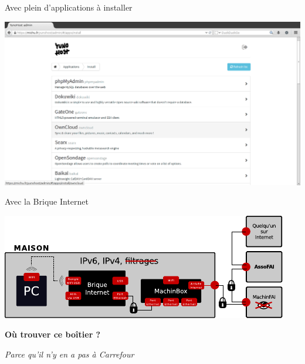 \documentclass[notes=hide]{beamer}
\begin{document}
\begin{frame}[t]{Avec plein d'applications à installer}
\begin{center}
\vfill
\includegraphics[width=\textwidth]{img/19-capture-yunohostapps.png}
\vfill
\end{center}
\end{frame}


\begin{frame}[t]{Avec la Brique Internet}
\begin{center}
\vfill
\includegraphics[width=.9\textwidth]{img/schema2.pdf}
\vfill
\end{center}
\end{frame}


\begin{frame}[t]{}
\begin{center}
\vfill
{\Huge \textbf{Où trouver ce boîtier ?}}
\vspace{.5cm}

{\large \emph{Parce qu'il n'y en a pas à Carrefour}}
\vfill
\end{center}
\end{frame}
\end{document}
